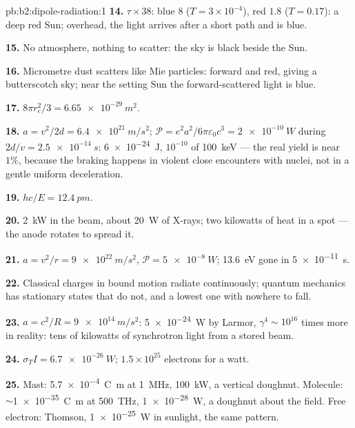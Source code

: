 \begin{solution}{pb:b2:dipole-radiation:1}
\textbf{14.} $\tau \times 38$: blue $8$ ($T = 3 \times 10^{-4}$), red $1.8$ ($T = 0.17$): a deep
red Sun; overhead, the light arrives after a short path and is blue.

\textbf{15.} No atmosphere, nothing to scatter: the sky is black beside
the Sun.

\textbf{16.} Micrometre dust scatters like Mie particles: forward and
red, giving a butterscotch sky; near the setting Sun the
forward-scattered light is blue.

\textbf{17.} $8\pi r_e^2/3 = \qty{6.65e-29}{m^2}$.

\textbf{18.} $a = v^2/2d = \qty{6.4e21}{m/s^2}$; $\mathcal P = e^2a^2/6\pi\varepsilon_0c^3 =
\qty{2e-10}{W}$ during $2d/v = \qty{2.5e-14}{s}$: \qty{6e-24}{J}, $10^{-10}$ of
\qty{100}{keV} --- the real yield is near $1\%$, because the braking happens
in violent close encounters with nuclei, not in a gentle uniform
deceleration.

\textbf{19.} $hc/E = \qty{12.4}{pm}$.

\textbf{20.} \qty{2}{kW} in the beam, about \qty{20}{W} of X-rays; two kilowatts
of heat in a spot --- the anode rotates to spread it.

\textbf{21.} $a = v^2/r = \qty{9e22}{m/s^2}$, $\mathcal P = \qty{5e-8}{W}$; \qty{13.6}{eV} gone
in \qty{5e-11}{s}.

\textbf{22.} Classical charges in bound motion radiate continuously;
quantum mechanics has stationary states that do not, and a lowest one
with nowhere to fall.

\textbf{23.} $a = c^2/R = \qty{9e14}{m/s^2}$: \qty{5e-24}{W} by Larmor, $\gamma^4 \sim 10^{16}$
times more in reality: tens of kilowatts of synchrotron light from a
stored beam.

\textbf{24.} $\sigma_TI = \qty{6.7e-26}{W}$; $1.5 \times 10^{25}$ electrons for a watt.

\textbf{25.} Mast: \qty{5.7e-4}{C.m} at \qty{1}{MHz}, \qty{100}{kW}, a vertical
doughnut. Molecule: $\sim$\qty{1e-35}{C.m} at \qty{500}{THz}, \qty{1e-28}{W},
a doughnut about the field. Free electron: Thomson, \qty{1e-25}{W} in
sunlight, the same pattern.
\end{solution}

